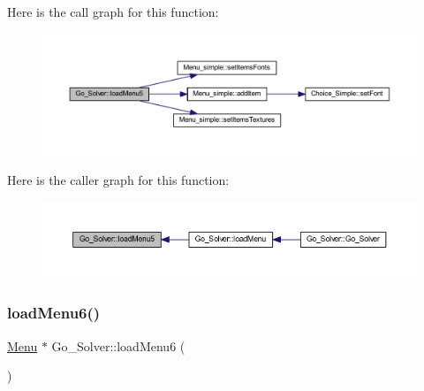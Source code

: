 Here is the call graph for this function\+:
\nopagebreak
\begin{figure}[H]
\begin{center}
\leavevmode
\includegraphics[width=350pt]{class_go___solver_a480bbc610bbc9bb3b1c675d69128d1fd_cgraph}
\end{center}
\end{figure}
Here is the caller graph for this function\+:
\nopagebreak
\begin{figure}[H]
\begin{center}
\leavevmode
\includegraphics[width=350pt]{class_go___solver_a480bbc610bbc9bb3b1c675d69128d1fd_icgraph}
\end{center}
\end{figure}
\mbox{\label{class_go___solver_a9aa3c644c34232cbc9bd3341930373c9}} 
\subsubsection{\texorpdfstring{load\+Menu6()}{loadMenu6()}}
{\footnotesize\ttfamily \hyperlink{class_menu}{Menu} $\ast$ Go\+\_\+\+Solver\+::load\+Menu6 (\begin{DoxyParamCaption}{ }\end{DoxyParamCaption})\hspace{0.3cm}{\ttfamily [static]}}

